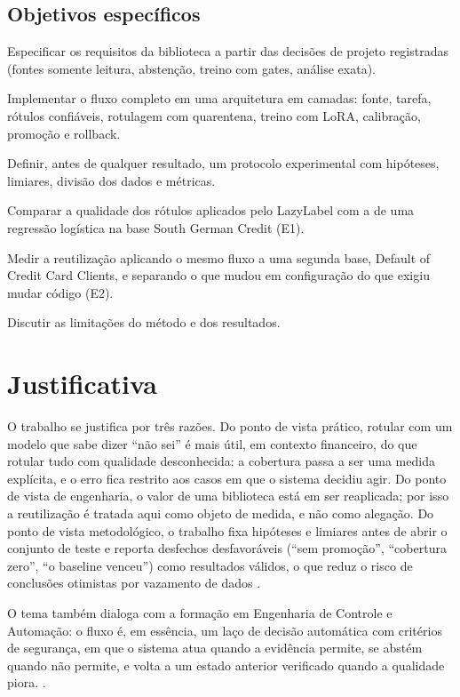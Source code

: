 \subsection{Objetivos específicos}

\begin{alineas}
  \item Especificar os requisitos da biblioteca a partir das decisões de projeto registradas (fontes somente leitura, abstenção, treino com gates, análise exata).
  \item Implementar o fluxo completo em uma arquitetura em camadas: fonte, tarefa, rótulos confiáveis, rotulagem com quarentena, treino com LoRA, calibração, promoção e rollback.
  \item Definir, antes de qualquer resultado, um protocolo experimental com hipóteses, limiares, divisão dos dados e métricas.
  \item Comparar a qualidade dos rótulos aplicados pelo LazyLabel com a de uma regressão logística na base South German Credit (E1).
  \item Medir a reutilização aplicando o mesmo fluxo a uma segunda base, Default of Credit Card Clients, e separando o que mudou em configuração do que exigiu mudar código (E2).
  \item Discutir as limitações do método e dos resultados.
\end{alineas}

\section{Justificativa}

O trabalho se justifica por três razões. Do ponto de vista prático, rotular com um modelo que sabe dizer ``não sei'' é mais útil, em contexto financeiro, do que rotular tudo com qualidade desconhecida: a cobertura passa a ser uma medida explícita, e o erro fica restrito aos casos em que o sistema decidiu agir. Do ponto de vista de engenharia, o valor de uma biblioteca está em ser reaplicada; por isso a reutilização é tratada aqui como objeto de medida, e não como alegação. Do ponto de vista metodológico, o trabalho fixa hipóteses e limiares antes de abrir o conjunto de teste e reporta desfechos desfavoráveis (``sem promoção'', ``cobertura zero'', ``o baseline venceu'') como resultados válidos, o que reduz o risco de conclusões otimistas por vazamento de dados \cite{kaufman2012}.

O tema também dialoga com a formação em Engenharia de Controle e Automação: o fluxo é, em essência, um laço de decisão automática com critérios de segurança, em que o sistema atua quando a evidência permite, se abstém quando não permite, e volta a um estado anterior verificado quando a qualidade piora. .

